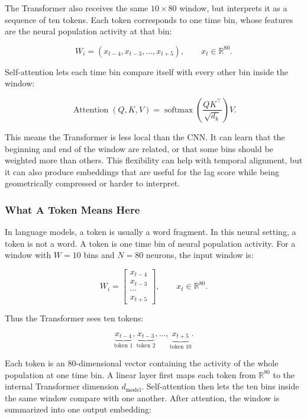 \documentclass[11pt]{article}
\begin{document}
The Transformer also receives the same $10 \times 80$ window, but interprets
it as a sequence of ten tokens. Each token corresponds to one time bin, whose
features are the neural population activity at that bin:

\begin{equation}
W_i =
(x_{t-4}, x_{t-3}, \ldots, x_{t+5}),
\qquad
x_t \in \mathbb{R}^{80}.
\end{equation}

Self-attention lets each time bin compare itself with every other bin inside
the window:

\begin{equation}
\operatorname{Attention}(Q,K,V)
=
\operatorname{softmax}
\left(
\frac{QK^\top}{\sqrt{d_k}}
\right)V.
\end{equation}

This means the Transformer is less local than the CNN. It can learn that the
beginning and end of the window are related, or that some bins should be
weighted more than others. This flexibility can help with temporal alignment,
but it can also produce embeddings that are useful for the lag score while
being geometrically compressed or harder to interpret.

\subsubsection{What A Token Means Here}

In language models, a token is usually a word fragment. In this neural setting,
a token is not a word. A token is one time bin of neural population activity.
For a window with $W=10$ bins and $N=80$ neurons, the input window is:

\begin{equation}
W_i =
\begin{bmatrix}
x_{t-4} \\
x_{t-3} \\
\cdots \\
x_{t+5}
\end{bmatrix},
\qquad
x_t \in \mathbb{R}^{80}.
\end{equation}

Thus the Transformer sees ten tokens:

\begin{equation}
\underbrace{x_{t-4}}_{\text{token 1}},
\underbrace{x_{t-3}}_{\text{token 2}},
\ldots,
\underbrace{x_{t+5}}_{\text{token 10}}.
\end{equation}

Each token is an 80-dimensional vector containing the activity of the whole
population at one time bin. A linear layer first maps each token from
$\mathbb{R}^{80}$ to the internal Transformer dimension $d_{\text{model}}$.
Self-attention then lets the ten bins inside the same window compare with one
another. After attention, the window is summarized into one output embedding:
\end{document}
